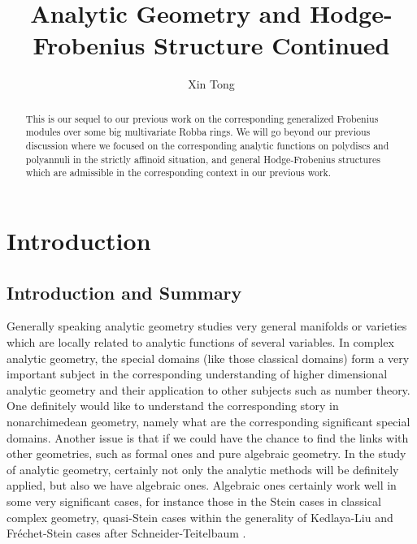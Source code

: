 \documentclass[12pt]{amsart}
\theoremstyle{definition}
\numberwithin{equation}{section}
\begin{document}
\normalfont



\title{Analytic Geometry and Hodge-Frobenius Structure Continued}
\author{Xin Tong}



\maketitle


\begin{abstract}
\rm This is our sequel to our previous work on the corresponding generalized Frobenius modules over some big multivariate Robba rings. We will go beyond our previous discussion where we focused on the corresponding analytic functions on polydiscs and polyannuli in the strictly affinoid situation, and general Hodge-Frobenius structures which are admissible in the corresponding context in our previous work. 
\end{abstract}



\newpage

\tableofcontents


\newpage



\section{Introduction}


\subsection{Introduction and Summary}


\noindent Generally speaking analytic geometry studies very general manifolds or varieties which are locally related to analytic functions of several variables. In complex analytic geometry, the special domains (like those classical domains) form a very important subject in the corresponding understanding of higher dimensional analytic geometry and their application to other subjects such as number theory. One definitely would like to understand the corresponding story in nonarchimedean geometry, namely what are the corresponding significant special domains. Another issue is that if we could have the chance to find the links with other geometries, such as formal ones and pure algebraic geometry. In the study of analytic geometry, certainly not only the analytic methods will be definitely applied, but also we have algebraic ones. Algebraic ones certainly work well in some very significant cases, for instance those in the Stein cases in classical complex geometry, quasi-Stein cases within the generality of Kedlaya-Liu \cite{KL2} and Fr\'echet-Stein cases after Schneider-Teitelbaum \cite{ST}.\\
\end{document}
